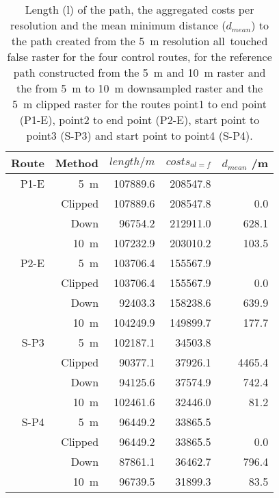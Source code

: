 \begin{table}[h!]
	\caption{Length (l) of the path, the aggregated costs per resolution and the mean minimum distance ($d_{mean}$) to the path created from the 5~m resolution all~touched false raster for the four control routes, for the reference path constructed from the 5~m  and 10~m raster and the from 5~m to 10~m downsampled raster and the 5~m clipped raster for the routes point1 to end point (P1-E), point2 to end point (P2-E), start point to point3 (S-P3) and start point to point4 (S-P4).}
	\label{tab:6}
	\centering
	\begin{tabular}{ r @{\hspace*{3mm}}  r  r  r  r}
		Route & Method & $length /m$ & $costs_{al=f}$ & $d_{mean}$ /m \\
		\hline
		P1-E & 5~m 			& 107889.6 & 208547.8 &        \\
		 	 & Clipped 		& 107889.6 & 208547.8 &   0.0  \\
		 	 & Down			&  96754.2 & 212911.0 & 628.1 \\
		 	 & 10~m 		& 107232.9 & 203010.2 & 103.5 \\
		\hline
		P2-E & 5~m 			& 103706.4 & 155567.9 &        \\
		 	 & Clipped 		& 103706.4 & 155567.9 &   0.0 \\
		 	 & Down 	    &  92403.3 & 158238.6	& 639.9 \\
		 	 & 10~m 		& 104249.9 & 149899.7 & 177.7 \\
		\hline
		S-P3 & 5~m 			& 102187.1 & 34503.8 	&         \\
			 & Clipped 		&  90377.1 & 37926.1 	& 4465.4 \\
			 & Down 	    &  94125.6 & 37574.9 	&  742.4 \\
			 & 10~m 		& 102461.6 & 32446.0 	&   81.2 \\
		\hline
		S-P4 & 5~m 			& 96449.2 	& 33865.5 	&  		\\
		 	 & Clipped 		& 96449.2 	& 33865.5 	& 0.0 	\\
			 & Down 		& 87861.1 	& 36462.7 	& 796.4\\
			 & 10~m 		& 96739.5 	& 31899.3	& 83.5 \\

		
	\end{tabular}
\end{table}



